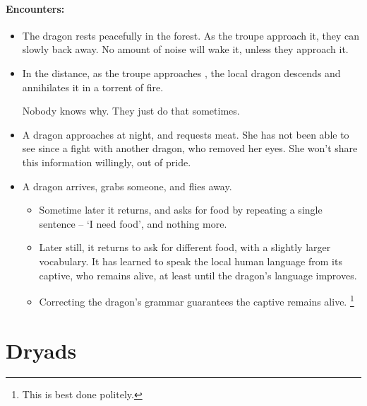 \begin{multicols}{2}
\paragraph{Encounters:}

\begin{itemize}
  \item
  The dragon rests peacefully in the forest.
  As the troupe approach it, they can slowly back away.
  No amount of noise will wake it, unless they approach it.
  \item
  In the distance, as the troupe approaches , the local dragon descends and annihilates it in a torrent of fire.

  Nobody knows why.
  They just do that sometimes.
  \item
  A dragon approaches  at night, and requests meat.
  She has not been able to see since a fight with another dragon, who removed her eyes.
  She won't share this information willingly, out of pride.
  \item
  A dragon arrives, grabs someone, and flies away.
  \begin{itemize}
    \item
    Sometime later it returns, and asks for food by repeating a single sentence -- `I need food', and nothing more.
    \item
    Later still, it returns to ask for different food, with a slightly larger vocabulary.
    It has learned to speak the local human language from its captive, who remains alive, at least until the dragon's language improves.
    \item
    Correcting the dragon's grammar guarantees the captive remains alive.%
    \footnote{This is best done politely.}
  \end{itemize}
\end{itemize}

\end{multicols}

\section[Dryad]{Dryads}
\label{dryad}

